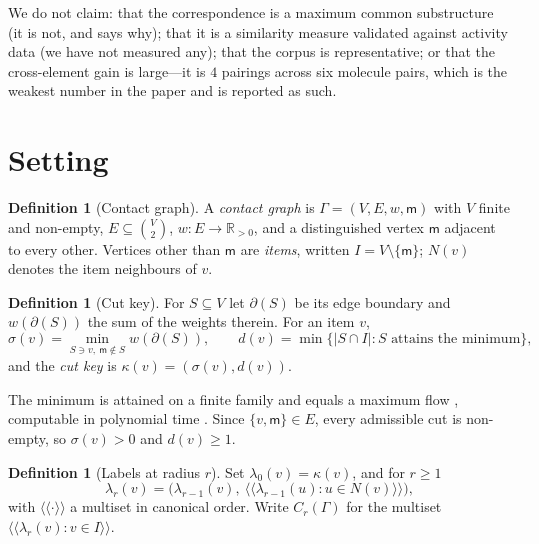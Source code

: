 \documentclass[11pt,twocolumn,a4paper]{article}
\theoremstyle{scthm}
\theoremstyle{definition}
\newtheorem{definition}[theorem]{Definition}
\theoremstyle{remark}
\newcommand{\R}{\mathbb{R}}
\newcommand{\Gph}{\Gamma}
\newcommand{\V}{V}
\newcommand{\E}{E}
\newcommand{\wt}{w}
\newcommand{\med}{\mathsf{m}}
\newcommand{\cut}{\partial}
\newcommand{\sep}{\sigma}
\newcommand{\dep}{d}
\newcommand{\key}{\kappa}
\newcommand{\lab}{\lambda}
\newcommand{\abs}[1]{\lvert#1\rvert}
\begin{document}
We do not claim: that the correspondence is a maximum common substructure
(it is not, and  says why); that it is a similarity
measure validated against activity data (we have not measured any); that
the corpus is representative; or that the cross-element gain is large---it
is $4$ pairings across six molecule pairs, which is the weakest number in
the paper and is reported as such.

\section{Setting}
\label{sec:setting}

\begin{definition}[Contact graph]
\label{def:graph}
A \emph{contact graph} is $\Gph=(\V,\E,\wt,\med)$ with $\V$ finite and
non-empty, $\E\subseteq\binom{\V}{2}$, $\wt\colon\E\to\R_{>0}$, and a
distinguished vertex $\med$ adjacent to every other. Vertices other than
$\med$ are \emph{items}, written $I=\V\setminus\{\med\}$; $N(v)$ denotes
the item neighbours of $v$.
\end{definition}

\begin{definition}[Cut key]
\label{def:key}
For $S\subseteq\V$ let $\cut(S)$ be its edge boundary and
$\wt(\cut(S))$ the sum of the weights therein. For an item $v$,
\[
\sep(v)=\min_{S\ni v,\ \med\notin S}\wt(\cut(S)),
\qquad
\dep(v)=\min\{\abs{S\cap I}: S\text{ attains the minimum}\},
\]
and the \emph{cut key} is $\key(v)=(\sep(v),\dep(v))$.
\end{definition}

The minimum is attained on a finite family and equals a maximum flow
\citep{fordfulkerson1956}, computable in polynomial time
\citep{stoer1997}. Since $\{v,\med\}\in\E$, every admissible cut is
non-empty, so $\sep(v)>0$ and $\dep(v)\ge1$.

\begin{definition}[Labels at radius $r$]
\label{def:radius}
Set $\lab_0(v)=\key(v)$, and for $r\ge1$
\begin{equation}
\lab_r(v)=\bigl(\lab_{r-1}(v),\
\langle\!\langle \lab_{r-1}(u):u\in N(v)\rangle\!\rangle\bigr),
\label{eq:refine}
\end{equation}
with $\langle\!\langle\cdot\rangle\!\rangle$ a multiset in canonical
order. Write $C_r(\Gph)$ for the multiset
$\langle\!\langle \lab_r(v):v\in I\rangle\!\rangle$.
\end{definition}
\end{document}
